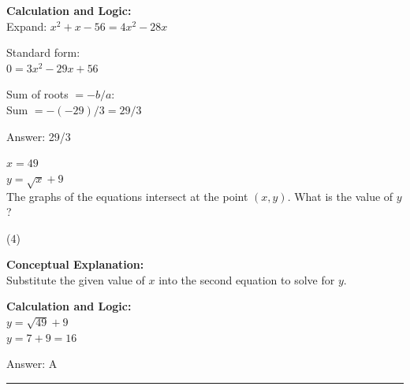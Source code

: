 \documentclass[11pt,paper=a4,answers]{exam}
\begin{document}
\begin{questions}
\begin{solution}
\textbf{Calculation and Logic:} \\
Expand: $x^2 + x - 56 = 4x^2 - 28x$

\vspace{10pt}

Standard form: \\
$0 = 3x^2 - 29x + 56$

\vspace{10pt}

Sum of roots $= -b / a$: \\
Sum $= -(-29) / 3 = 29/3$

\vspace{25pt}

Answer: \colorbox{yellow!100}{29/3}
\end{solution}

\vspace{40pt}

\question
$x = 49$ \\
$y = \sqrt{x} + 9$ \\
The graphs of the equations intersect at the point $(x, y)$. What is the value of $y$?
\begin{tasks}(4)
\end{tasks}

\begin{solution}
\textbf{Conceptual Explanation:} \\
Substitute the given value of $x$ into the second equation to solve for $y$.

\vspace{20pt}

\textbf{Calculation and Logic:} \\
$y = \sqrt{49} + 9$ \\
$y = 7 + 9 = 16$

\vspace{25pt}

Answer: \colorbox{yellow!100}{A}
\end{solution}

\end{questions}
\begin{center}
\rule{.5\textwidth}{1pt}
\end{center}
\end{document}

